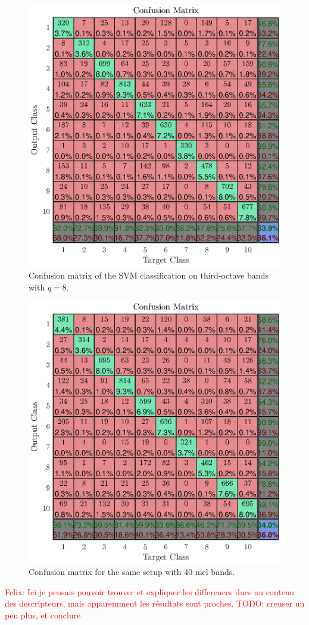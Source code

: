 \documentclass[final,3p,times,twocolumn]{elsarticle}
\newcommand{\fg}[1]{\textcolor{red}{ Felix: #1}}
\begin{document}
\begin{figure}[htbp]
	\centering
		\includegraphics[width=\columnwidth]{tob_conf.eps}
	\caption{Confusion matrix of the SVM classification on third-octave bands with $q = 8$.}
	\label{fig:tob_conf}
\end{figure}

\begin{figure}[htbp]
	\centering
		\includegraphics[width=\columnwidth]{mel_conf.eps}
	\caption{Confusion matrix for the same setup with 40 mel bands.}
	\label{fig:mel_conf}
\end{figure}
\fg{Ici je pensais pouvoir trouver et expliquer les differences dues au contenu des descripteurs, mais apparemment les résultats sont proches. TODO: creuser un peu plus, et conclure}
\end{document}
